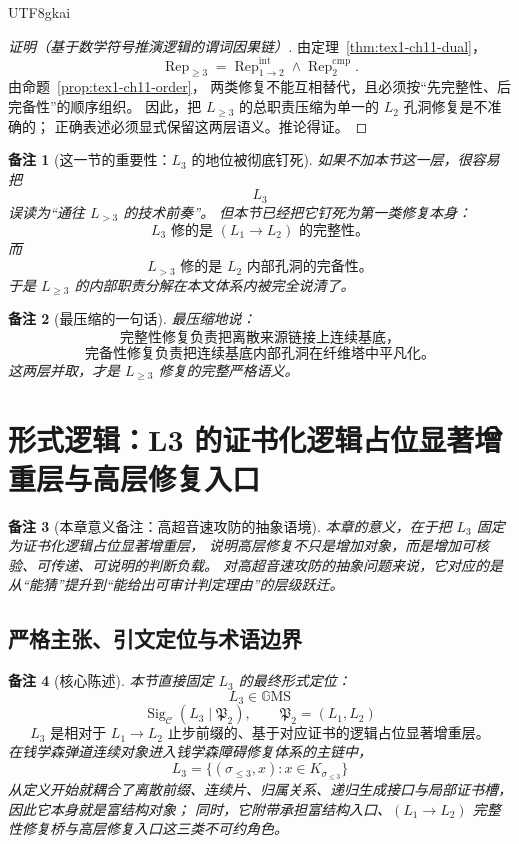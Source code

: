 \documentclass[12pt]{article}
\newtheorem{remark}{备注}[section]
\newcommand{\GMS}{\mathbb{G}\mathrm{MS}}
\begin{document}
\begin{CJK*}{UTF8}{gkai}
\begin{proof}[证明（基于数学符号推演逻辑的谓词因果链）]
由定理~\ref{thm:tex1-ch11-dual}，
\[
  \operatorname{Rep}_{\ge3}
  =
  \operatorname{Rep}^{\mathrm{int}}_{1\to2}
  \wedge
  \operatorname{Rep}^{\mathrm{cmp}}_{2}.
\]
由命题~\ref{prop:tex1-ch11-order}，
两类修复不能互相替代，且必须按“先完整性、后完备性”的顺序组织。
因此，把 \(L_{\ge3}\) 的总职责压缩为单一的 \(L_2\) 孔洞修复是不准确的；
正确表述必须显式保留这两层语义。推论得证。
\end{proof}

\begin{remark}[这一节的重要性：\(L_3\) 的地位被彻底钉死]
如果不加本节这一层，很容易把
\[
  L_3
\]
误读为“通往 \(L_{>3}\) 的技术前奏”。
但本节已经把它钉死为第一类修复本身：
\[
  L_3\text{ 修的是 }(L_1\to L_2)\text{ 的完整性。}
\]
而
\[
  L_{>3}\text{ 修的是 }L_2\text{ 内部孔洞的完备性。}
\]
于是 \(L_{\ge3}\) 的内部职责分解在本文体系内被完全说清了。
\end{remark}

\begin{remark}[最压缩的一句话]
最压缩地说：
\[
  \boxed{
    \text{完整性修复负责把离散来源链接上连续基底，}
  }
\]
\[
  \boxed{
    \text{完备性修复负责把连续基底内部孔洞在纤维塔中平凡化。}
  }
\]
这两层并取，才是 \(L_{\ge3}\) 修复的完整严格语义。
\end{remark}

\clearpage
\section{形式逻辑：L3 的证书化逻辑占位显著增重层与高层修复入口}
\label{sec:tex1-ch12}

\begin{remark}[本章意义备注：高超音速攻防的抽象语境]
本章的意义，在于把 \(L_3\) 固定为证书化逻辑占位显著增重层，
说明高层修复不只是增加对象，而是增加可核验、可传递、可说明的判断负载。
对高超音速攻防的抽象问题来说，它对应的是从“能猜”提升到“能给出可审计判定理由”的层级跃迁。
\end{remark}

\subsection{严格主张、引文定位与术语边界}
\label{subsec:tex1-ch12-claim}

\begin{remark}[核心陈述]
本节直接固定 \(L_3\) 的最终形式定位：
\[
  \boxed{
    L_3\in \GMS
  }
\]
\[
  \boxed{
    \operatorname{Sig}_{\mathcal C}(L_3\mid \mathfrak P_2),
    \qquad
    \mathfrak P_2=(L_1,L_2)
  }
\]
\[
  \boxed{
    L_3\text{ 是相对于 }L_1\to L_2\text{ 止步前缀的、基于对应证书的逻辑占位显著增重层。}
  }
\]
在钱学森弹道连续对象进入钱学森障碍修复体系的主链中，
\[
  L_3=\{(\sigma_{\le 3},x):x\in K_{\sigma_{\le 3}}\}
\]
从定义开始就耦合了离散前缀、连续片、归属关系、递归生成接口与局部证书槽，
因此它本身就是富结构对象；
同时，它附带承担富结构入口、\((L_1\to L_2)\) 完整性修复桥与高层修复入口这三类不可约角色。
\end{remark}


\end{CJK*}
\end{document}
